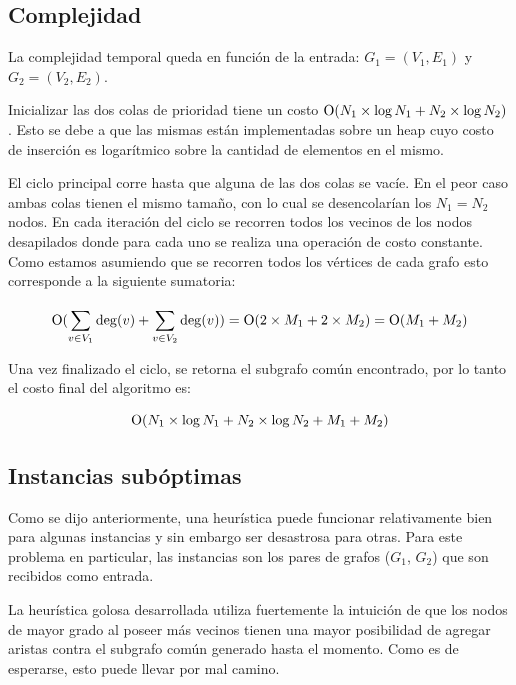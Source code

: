 \subsection{Complejidad}

La complejidad temporal queda en función de la entrada: $G_1 = (V_1, E_1)$ y $G_2 = (V_2,
E_2)$.

Inicializar las dos colas de prioridad tiene un costo $\operatorname{O}(N_1 \times \log N_1 + N_2
\times \log N_2)$. Esto se debe a que las mismas están implementadas sobre un heap cuyo costo
de inserción es logarítmico sobre la cantidad de elementos en el mismo.

El ciclo principal corre hasta que alguna de las dos colas se vacíe. En el peor caso
ambas colas tienen el mismo tamaño, con lo cual se desencolarían los $N_1 = N_2$
nodos. En cada iteración del ciclo se recorren todos los vecinos de los nodos
desapilados donde para cada uno se realiza una operación de costo constante.
Como estamos asumiendo que se recorren todos los vértices de cada grafo esto
corresponde a la siguiente sumatoria:

\begin{equation*}
	\operatorname{O}(\sum_{v \in V_1}^{} \deg(v) + \sum_{v \in V_2}^{} \deg(v)) =
	\operatorname{O}(2 \times M_1 + 2 \times M_2) = \operatorname{O}(M_1 + M_2)
\end{equation*}

Una vez finalizado el ciclo, se retorna el subgrafo común encontrado, por lo
tanto el costo final del algoritmo es:

\begin{equation*}
	\operatorname{O}(N_1 \times \log N_1 + N_2 \times \log N_2 + M_1 + M_2)
\end{equation*}

\subsection{Instancias subóptimas}\label{sec:ej4:suboptimal}

Como se dijo anteriormente, una heurística puede funcionar relativamente bien
para algunas instancias y sin embargo ser desastrosa para otras. Para este
problema en particular, las instancias son los pares de grafos ($G_1$, $G_2$) que
son recibidos como entrada.

La heurística golosa desarrollada utiliza fuertemente la intuición de que los
nodos de mayor grado al poseer más vecinos tienen una mayor posibilidad de
agregar aristas contra el subgrafo común generado hasta el momento. Como es de
esperarse, esto puede llevar por mal camino.

